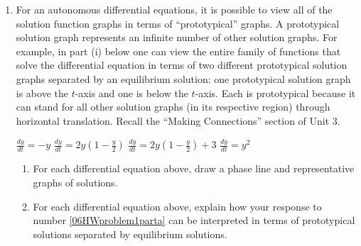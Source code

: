 
\begin{enumerate}
\item For an autonomous differential equations, it is possible to view all of the solution function graphs in terms of ``prototypical'' graphs. A prototypical solution graph represents an infinite number of other solution graphs. For example, in part (i) below one can view the entire family of functions that solve the differential equation in terms of two different prototypical solution graphs separated by an equilibrium solution: one prototypical solution graph is above the $t$-axis and one is below the $t$-axis. Each is prototypical because it can stand for all other solution graphs (in its respective region) through horizontal translation. Recall the ``Making Connections'' section of Unit 3. \label{06HWproblem1}
\begin{hnumerate}
\hitem    $\displaystyle\frac{dy}{dt}=-y$    \hitem $\displaystyle\frac{dy}{dt}=2y\left(1-\frac{y}{2}\right)$        \hitem $\displaystyle\frac{dy}{dt}=2y\left(1-\frac{y}{2}\right)+3$        \hitem   $\displaystyle\frac{dy}{dt}=y^2$ \end{hnumerate}
\begin{enumerate}
\item For each differential equation above, draw a phase line and representative graphs of solutions. \label{06HWproblem1parta}
\item For each differential equation above, explain how your response to number \ref{06HWproblem1parta} can be interpreted in terms of prototypical solutions separated by equilibrium solutions. \label{06HWproblem1partb} 
\end{enumerate}


\end{enumerate}
